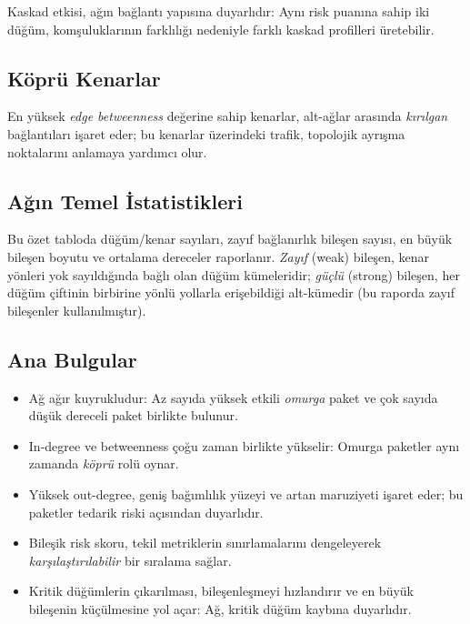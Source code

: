 \documentclass[11pt,a4paper]{article}
\begin{document}
\noindent Kaskad etkisi, ağın bağlantı yapısına duyarlıdır: Aynı risk puanına sahip iki düğüm, komşuluklarının farklılığı nedeniyle farklı kaskad profilleri üretebilir.

\subsection{Köprü Kenarlar}
\noindent En yüksek \emph{edge betweenness} değerine sahip kenarlar, alt-ağlar arasında \emph{kırılgan} bağlantıları işaret eder; bu kenarlar üzerindeki trafik, topolojik ayrışma noktalarını anlamaya yardımcı olur.

\subsection{Ağın Temel İstatistikleri}

\noindent Bu özet tabloda düğüm/kenar sayıları, zayıf bağlanırlık bileşen sayısı, en büyük bileşen boyutu ve ortalama dereceler raporlanır. \emph{Zayıf} (weak) bileşen, kenar yönleri yok sayıldığında bağlı olan düğüm kümeleridir; \emph{güçlü} (strong) bileşen, her düğüm çiftinin birbirine yönlü yollarla erişebildiği alt-kümedir (bu raporda zayıf bileşenler kullanılmıştır).

\subsection{Ana Bulgular }
\begin{itemize}
  \item Ağ ağır kuyrukludur: Az sayıda yüksek etkili \emph{omurga} paket ve çok sayıda düşük dereceli paket birlikte bulunur.
  \item In-degree ve betweenness çoğu zaman birlikte yükselir: Omurga paketler aynı zamanda \emph{köprü} rolü oynar.
  \item Yüksek out-degree, geniş bağımlılık yüzeyi ve artan maruziyeti işaret eder; bu paketler tedarik riski açısından duyarlıdır.
  \item Bileşik risk skoru, tekil metriklerin sınırlamalarını dengeleyerek \emph{karşılaştırılabilir} bir sıralama sağlar.
  \item Kritik düğümlerin çıkarılması, bileşenleşmeyi hızlandırır ve en büyük bileşenin küçülmesine yol açar: Ağ, kritik düğüm kaybına duyarlıdır.
\end{itemize}
\end{document}
